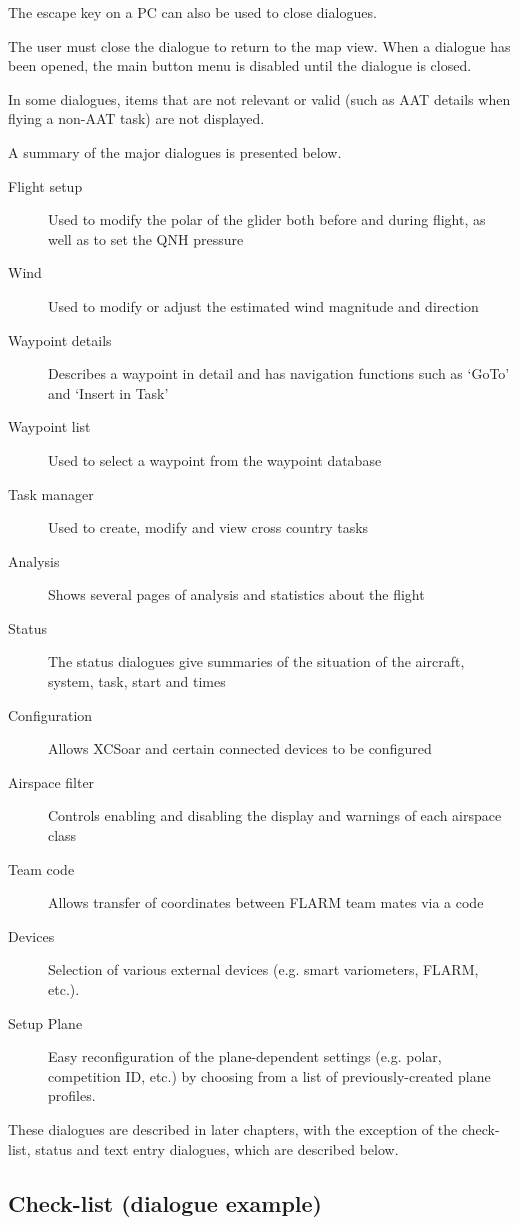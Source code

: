 The escape key on a PC can also be used to close dialogues.

The user must close the dialogue to return to the map view. When a dialogue
has been opened, the main button menu is disabled until the dialogue is closed.

In some dialogues, items that are not relevant or valid (such as AAT details when
flying a non-AAT task) are not displayed.

A summary of the major dialogues is presented below.
\begin{description}
\item[Flight setup] Used to modify the polar of the glider both before and
during flight, as well as to set the QNH pressure
\item[Wind] Used to modify or adjust the estimated wind magnitude and direction
\item[Waypoint details] Describes a waypoint in detail and has navigation
functions such as `GoTo' and `Insert in Task'
\item[Waypoint list] Used to select a waypoint from the waypoint database
\item[Task manager] Used to create, modify and view cross country tasks
\item[Analysis] Shows several pages of analysis and statistics about the flight
\item[Status] The status dialogues give summaries of the situation of the 
aircraft, system, task, start and times
\item[Configuration] Allows XCSoar and certain connected devices to be
configured
\item[Airspace filter] Controls enabling and disabling the display and warnings
of each airspace class
\item[Team code] Allows transfer of coordinates between FLARM team mates via a 
  code
\item[Devices]  Selection of various external devices (e.g. smart variometers, 
  FLARM, etc.).
\item[Setup Plane]  Easy reconfiguration of the plane-dependent settings (e.g. 
  polar, competition ID, etc.) by choosing from a list of previously-created 
  plane profiles.
\end{description}

These dialogues are described in later chapters, with the exception of the
check-list, status and text entry dialogues, which are described below.


\subsection*{Check-list (dialogue example)}\label{sec:checklist}

